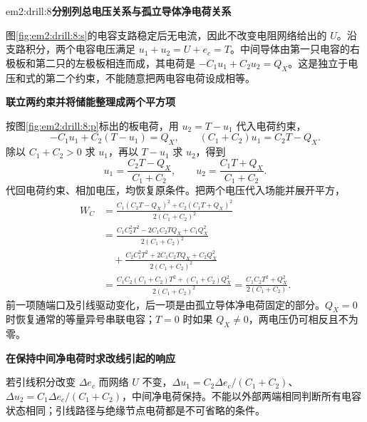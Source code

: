 \begin{drillsolution}{em2:drill:8}\textbf{分别列总电压关系与孤立导体净电荷关系}\par\nobreak
图\ref{fig:em2:drill:8:s}的电容支路稳定后无电流，因此不改变电阻网络给出的 $U$。沿支路积分，两个电容电压满足 $u_1+u_2=U+e_c=T$。中间导体由第一只电容的右极板和第二只的左极板相连而成，其电荷是 $-C_1u_1+C_2u_2=Q_X$。这是独立于电压和式的第二个约束，不能随意把两电容电荷设成相等。



\par\medskip{}\noindent\textbf{联立两约束并将储能整理成两个平方项}\par\nobreak
按图\ref{fig:em2:drill:8:p}标出的板电荷，用 $u_2=T-u_1$ 代入电荷约束，
\[
 -C_1u_1+C_2(T-u_1)=Q_X,
 \qquad (C_1+C_2)u_1=C_2T-Q_X.
\]
除以 $C_1+C_2>0$ 求 $u_1$，再以 $T-u_1$ 求 $u_2$，得到
\[u_1=\frac{C_2T-Q_X}{C_1+C_2},\qquad u_2=\frac{C_1T+Q_X}{C_1+C_2}.\]
代回电荷约束、相加电压，均恢复原条件。把两个电压代入场能并展开平方，
\[
 \begin{aligned}
 W_C&=\frac{C_1(C_2T-Q_X)^2+C_2(C_1T+Q_X)^2}{2(C_1+C_2)^2}\\
 &=\frac{C_1C_2^2T^2-2C_1C_2TQ_X+C_1Q_X^2}{2(C_1+C_2)^2}\\
 &\quad+\frac{C_2C_1^2T^2+2C_1C_2TQ_X+C_2Q_X^2}{2(C_1+C_2)^2}\\
 &=\frac{C_1C_2(C_1+C_2)T^2+(C_1+C_2)Q_X^2}{2(C_1+C_2)^2}
 =\frac{C_1C_2T^2+Q_X^2}{2(C_1+C_2)}.
 \end{aligned}
\]
前一项随端口及引线驱动变化，后一项是由孤立导体净电荷固定的部分。$Q_X=0$ 时恢复通常的等量异号串联电容；$T=0$ 时如果 $Q_X\ne0$，两电压仍可相反且不为零。



\par\medskip{}\noindent\textbf{在保持中间净电荷时求改线引起的响应}\par\nobreak
若引线积分改变 $\Delta e_c$ 而网络 $U$ 不变，$\Delta u_1=C_2\Delta e_c/(C_1+C_2)$、$\Delta u_2=C_1\Delta e_c/(C_1+C_2)$，中间净电荷保持。不能以外部两端相同判断所有电容状态相同；引线路径与绝缘节点电荷都是不可省略的条件。\end{drillsolution}
